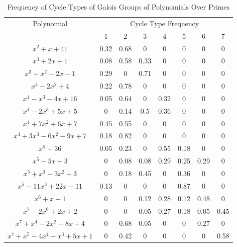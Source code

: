 \documentclass{article}
\begin{document}
\begin{table}[hp]
\begin{center}
\begin{tabular}{|c|ccccccc|}
\hline
\multirow{2}{*}{Polynomial}                                   & \multicolumn{7}{c|}{Cycle Type Frequency}              \\ \cline{2-8} 
                                                     & 1    & 2    & 3    & 4    & 5    & 6    & 7    \\ \hline
$x^2+x+41$                                           & 0.32 & 0.68 & 0    & 0    & 0    & 0    & 0    \\
$x^3+2x+1$                                           & 0.08 & 0.58 & 0.33 & 0    & 0    & 0    & 0    \\
$x^3+x^2-2x-1$                                       & 0.29 & 0    & 0.71 & 0    & 0    & 0    & 0    \\
$x^4-2x^2+4$                                         & 0.22 & 0.78 & 0    & 0    & 0    & 0    & 0    \\
$x^4-x^3-4x+16$                                      & 0.05 & 0.64 & 0    & 0.32 & 0    & 0    & 0    \\
$ x^4 - 2x^3 + 5x + 5$                               & 0    & 0.14 & 0.5  & 0.36 & 0    & 0    & 0    \\
$x^4 + 7x^2 + 6x + 7$             & 0.45 & 0.55 & 0    & 0    & 0    & 0    & 0    \\
$ x^4 + 3x^3 - 6x^2 - 9x + 7$    & 0.18 & 0.82 & 0    & 0    & 0    & 0    & 0    \\
$ x^5 + 36$                                          & 0.05 & 0.23 & 0    & 0.55 & 0.18 & 0    & 0    \\
$ x^5 - 5x + 3$              & 0    & 0.08 & 0.08 & 0.29 & 0.25 & 0.29 & 0    \\
$ x^5 + x^3 - 3x^2 + 3$                              & 0    & 0.18 & 0.45 & 0    & 0.36 & 0    & 0    \\
$ x^5 - 11x^3 + 22x - 11 $                           & 0.13 & 0    & 0    & 0    & 0.87 & 0    & 0    \\
$ x^6 + x + 1 $                                      & 0    & 0    & 0.12 & 0.28 & 0.12 & 0.48 & 0    \\
$ x^7 - 2x^6 + 2x + 2 $                              & 0    & 0    & 0.05 & 0.27 & 0.18 & 0.05 & 0.45 \\
$ x^7 + x^4 - 2x^2 + 8x + 4 $ & 0    & 0.68 & 0.05 & 0    & 0    & 0.27 & 0    \\
$ x^7 + x^5 - 4x^4 - x^3 + 5x + 1$                   & 0    & 0.42 & 0    & 0    & 0    & 0    & 0.58 \\ \hline
\end{tabular}
\caption{Frequency of Cycle Types of Galois Groups of Polynomials Over Primes}
\end{center}
\end{table}
\end{document}
